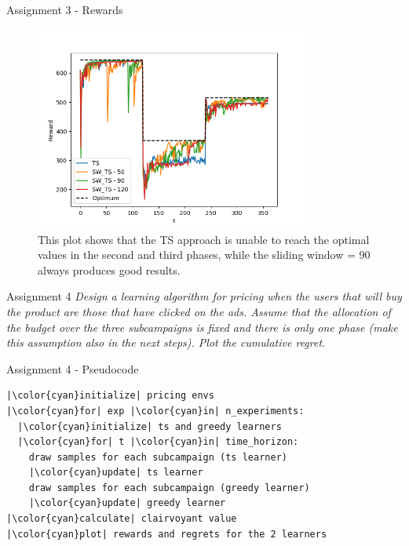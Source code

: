 \documentclass[11pt]{beamer}
\begin{document}
\begin{frame}{Assignment 3 - Rewards}
\begin{figure}[hbtp]
\centering
\includegraphics[width=0.8\textwidth]{images/assignment_3_exp_1_cum_reward.png}
\caption{This plot shows that the TS approach is unable to reach the optimal values in the second and third phases, while the sliding window = 90 always produces good results.}
\end{figure}
\end{frame}

\begin{frame}{Assignment 4}
\textit{Design a learning algorithm for pricing when the users that will buy the product are those that have clicked on the ads. Assume that the allocation of the budget over the three subcampaigns is fixed and there is only one phase (make this assumption also in the next steps). Plot the cumulative regret.}
\end{frame}

\begin{frame}[fragile]{Assignment 4 - Pseudocode}
\begin{lstlisting}
|\color{cyan}initialize| pricing envs
|\color{cyan}for| exp |\color{cyan}in| n_experiments:
  |\color{cyan}initialize| ts and greedy learners 
  |\color{cyan}for| t |\color{cyan}in| time_horizon:
    draw samples for each subcampaign (ts learner)
    |\color{cyan}update| ts learner
    draw samples for each subcampaign (greedy learner)
    |\color{cyan}update| greedy learner
|\color{cyan}calculate| clairvoyant value
|\color{cyan}plot| rewards and regrets for the 2 learners
\end{lstlisting}
\end{frame}
\end{document}
